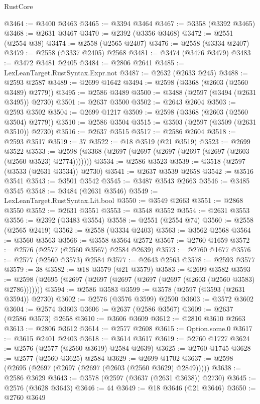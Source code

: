 \begin{lexlean}{RustCore}
\begin{coremodule}
@3464 := @3400 @3463
@3465 := @3394 @3464
@3467 := @3358 (@3392 @3465)
@3468 := @2631 @3467
@3470 := @2392 (@3356 @3468)
@3472 := @2551 (@2554 @38)
@3474 := @2558 (@2565 @2407)
@3476 := @2558 (@3334 @2407)
@3479 := @2558 (@3337 @2405) @2568
@3481 := @3474 (@3476 @3479)
@3483 := @3472 @3481 @2405
@3484 := @2806 @2641
@3485 := LexLeanTarget.RustSyntax.Expr.not
@3487 := @2632 (@2633 @245)
@3488 := @2593 @2587
@3489 := @2699 @1642
@3494 := @2598 (@3368 (@2603 (@2560 @3489) @2779))
@3495 := @2586 @3489
@3500 := @3488 (@2597 (@3494 (@2631 @3495)) @2730)
@3501 := @2637 @3500
@3502 := @2643 @2604
@3503 := @2593 @3502
@3504 := @2699 @1217
@3509 := @2598 (@3368 (@2603 (@2560 @3504) @2779))
@3510 := @2586 @3504
@3515 := @3503 (@2597 (@3509 (@2631 @3510)) @2730)
@3516 := @2637 @3515
@3517 := @2586 @2604
@3518 := @2593 @3517
@3519 := 37
@3522 := @18 @3519 (@21 @3519)
@3523 := @2699 @3522
@3533 := @2598 (@3368 (@2697 (@2697 (@2697 (@2697 (@2697 (@2603 (@2560 @3523) @2774)))))))
@3534 := @2586 @3523
@3539 := @3518 (@2597 (@3533 (@2631 @3534)) @2730)
@3541 := @2637 @3539 @2658
@3542 := @3516 @3541
@3543 := @3501 @3542
@3545 := @3487 @3543 @2663
@3546 := @3485 @3545
@3548 := @3484 (@2631 @3546)
@3549 := LexLeanTarget.RustSyntax.Lit.bool
@3550 := @3549 @2663
@3551 := @2868 @3550
@3552 := @2631 @3551
@3553 := @3548 @3552
@3554 := @2631 @3553
@3556 := @2392 (@3483 @3554)
@3558 := @2551 (@2554 @74)
@3560 := @2558 (@2565 @2419)
@3562 := @2558 (@3334 @2403)
@3563 := @3562 @2568
@3564 := @3560 @3563
@3566 := @3558 @3564 @2572
@3567 := @2760 @1659
@3572 := @2576 (@2577 (@2560 @3567) @2584 @2639)
@3573 := @2760 @1677
@3576 := @2577 (@2560 @3573) @2584
@3577 := @2643 @2563
@3578 := @2593 @3577
@3579 := 38
@3582 := @18 @3579 (@21 @3579)
@3583 := @2699 @3582
@3593 := @2598 (@2695 (@2697 (@2697 (@2697 (@2697 (@2697 (@2603 (@2560 @3583) @2786)))))))
@3594 := @2586 @3583
@3599 := @3578 (@2597 (@3593 (@2631 @3594)) @2730)
@3602 := @2576 (@3576 @3599) @2590
@3603 := @3572 @3602
@3604 := @2574 @3603
@3606 := @2637 (@2586 @3567)
@3609 := @2637 (@2586 @3573) @2658
@3610 := @3606 @3609
@3612 := @2810 @3610 @2663
@3613 := @2806 @3612
@3614 := @2577 @2608
@3615 := Option.some.{0}
@3617 := @3615 @2401 @2403
@3618 := @3614 @3617
@3619 := @2760 @1727
@3624 := @2576 (@2577 (@2560 @3619) @2584 @2639)
@3625 := @2760 @1745
@3628 := @2577 (@2560 @3625) @2584
@3629 := @2699 @1702
@3637 := @2598 (@2695 (@2697 (@2697 (@2697 (@2603 (@2560 @3629) @2849)))))
@3638 := @2586 @3629
@3643 := @3578 (@2597 (@3637 (@2631 @3638)) @2730)
@3645 := @2576 (@3628 @3643)
@3646 := 44
@3649 := @18 @3646 (@21 @3646)
@3650 := @2760 @3649

\end{coremodule}
\end{lexlean}
